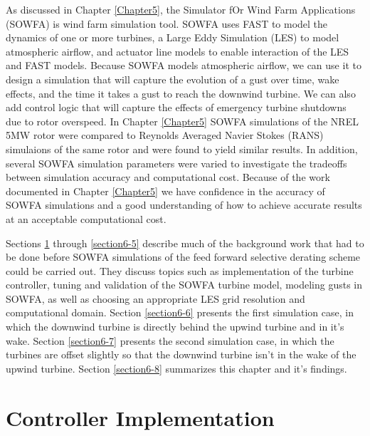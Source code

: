 As discussed in Chapter \ref{Chapter5}, the Simulator fOr Wind Farm Applications (SOWFA) is  wind farm simulation tool. SOWFA uses FAST to model the dynamics of one or more turbines, a Large Eddy Simulation (LES) to model atmospheric airflow, and actuator line models to enable interaction of the LES and FAST models. Because SOWFA models atmospheric airflow, we can use it to design a simulation that will capture the evolution of a gust over time, wake effects, and the time it takes a gust to reach the downwind turbine. We can also add control logic that will capture the effects of emergency turbine shutdowns due to rotor overspeed. In Chapter \ref{Chapter5} SOWFA simulations of the NREL 5MW rotor were compared to Reynolds Averaged Navier Stokes (RANS) simulaions of the same rotor and were found to yield similar results. In addition, several SOWFA simulation parameters were varied to investigate the tradeoffs between simulation accuracy and computational cost. Because of the work documented in Chapter \ref{Chapter5} we have confidence in the accuracy of SOWFA simulations and a good understanding of how to achieve accurate results at an acceptable computational cost.

Sections \ref{section6-2} through \ref{section6-5} describe much of the background work that had to be done before SOWFA simulations of the feed forward selective derating scheme could be carried out. They discuss topics such as implementation of the turbine controller, tuning and validation of the SOWFA turbine model, modeling gusts in SOWFA, as well as choosing an appropriate LES grid resolution and computational domain. Section \ref{section6-6} presents the first simulation case, in which the downwind turbine is directly behind the upwind turbine and in it's wake. Section \ref{section6-7} presents the second simulation case, in which the turbines are offset slightly so that the downwind turbine isn't in the wake of the upwind turbine. Section \ref{section6-8} summarizes this chapter and it's findings.




\section{Controller Implementation} \label{section6-2}

